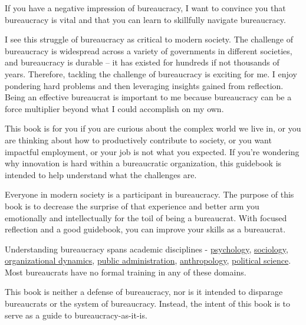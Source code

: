 

If you have a negative impression of bureaucracy, I want to convince you that bureaucracy is vital and that you can learn to skillfully navigate bureaucracy.

I see this struggle of bureaucracy as critical to modern society. The challenge of bureaucracy is widespread across a variety of governments in different societies, and bureaucracy is durable -- it has existed for hundreds if not thousands of years. Therefore, tackling the challenge of bureaucracy is exciting for me. I enjoy pondering hard problems and then leveraging insights gained from reflection. Being an effective bureaucrat is important to me because bureaucracy can be a force multiplier beyond what I could accomplish on my own.

This book is for you if you are curious about the complex world we live in, or you are thinking about how to productively contribute to society, or you want impactful employment, or your job is not what you expected. If you're wondering why innovation is hard within a bureaucratic organization, this guidebook is intended to help understand what the challenges are.


Everyone in modern society is a participant in bureaucracy. The purpose of this book is to decrease the surprise of that experience and better arm you emotionally and intellectually for the toil of being a bureaucrat. With focused reflection and a good guidebook, you can improve your skills as a bureaucrat. 

Understanding bureaucracy spans academic disciplines - \href{https://en.wikipedia.org/wiki/Psychology}{psychology}, \href{https://en.wikipedia.org/wiki/Sociology}{sociology}, \href{https://en.wikipedia.org/wiki/Organizational_behavior}{organizational dynamics}, \href{https://en.wikipedia.org/wiki/Public_administration}{public administration}, \href{https://en.wikipedia.org/wiki/Anthropology}{anthropology}, \href{https://en.wikipedia.org/wiki/Political_science}{political science}. Most bureaucrats have no formal training in any of these domains. 

This book is neither a defense of bureaucracy, nor is it intended to disparage bureaucrats or the system of bureaucracy. Instead, the intent of this book is to serve as a guide to bureaucracy-as-it-is. 

